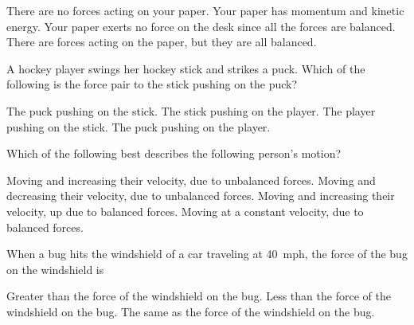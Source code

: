 \documentclass[answers]{exam}
\begin{document}
\begin{questions}
\begin{randomizechoices}[norandomize]
    \choice There are no forces acting on your paper.
    \choice Your paper has momentum and kinetic energy.
    \choice Your paper exerts no force on the desk since all the forces are balanced.
    \correctchoice There are forces acting on the paper, but they are all balanced.
\end{randomizechoices}

\question
A hockey player swings her hockey stick and strikes a puck.  Which of the following is the force pair to the stick pushing on the puck?

\begin{randomizechoices}[norandomize]
    \correctchoice The puck pushing on the stick.
    \choice The stick pushing on the player.
    \choice The player pushing on the stick.
    \choice The puck pushing on the player.
\end{randomizechoices}

\clearpage
\question 
Which of the following best describes the following person's motion?


\begin{center}
\end{center}

\begin{randomizechoices}[norandomize]
    \correctchoice Moving and increasing their velocity, due to unbalanced forces.
    \choice Moving and decreasing their velocity, due to unbalanced forces.
    \choice Moving and increasing their velocity, up due to balanced forces.
    \choice Moving at a constant velocity, due to balanced forces.
\end{randomizechoices}


\question 
When a bug hits the windshield of a car traveling at \SI{40}{mph}, the force of the bug on the windshield is

\begin{randomizechoices}[norandomize]
    \choice Greater than the force of the windshield on the bug.
    \choice Less than the force of the windshield on the bug.
    \correctchoice The same as the force of the windshield on the bug.
\end{randomizechoices}


\end{questions}
\end{document}
